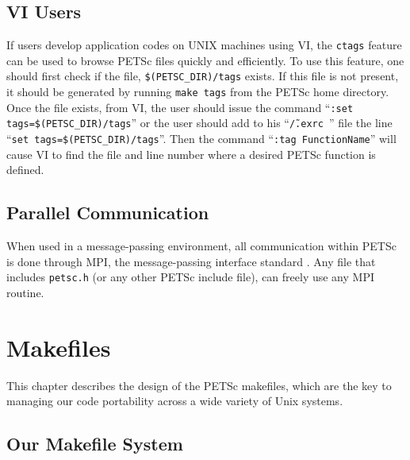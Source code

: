 \section{VI Users}  \label{sec:vi}

 
If users develop 
application codes on UNIX machines using VI, the {\tt ctags} feature 
can be used to browse PETSc files quickly and efficiently.  To use 
this feature, one should first check if the file, {\tt \$(PETSC\_DIR)/tags} 
exists.  If this file is not present, it should be generated by running 
{\tt make tags} from the PETSc home directory. Once the file exists, 
from VI, the user should issue the command ``{\tt :set tags=\$(PETSC\_DIR)/tags}'' 
or the user should add to
his ``{\tt \~/.exrc }'' file the line ``{\tt set tags=\$(PETSC\_DIR)/tags}''.
Then the command ``{\tt :tag FunctionName}'' will cause VI 
to find the file and line number where a desired PETSc function 
is defined. 

\section{Parallel Communication}

When used in a message-passing environment, all communication 
within
PETSc is done through MPI, the message-passing interface standard
\cite{MPI-final}.  Any file that includes {\tt petsc.h} (or any other 
PETSc include file), can freely use any MPI routine.

\chapter{Makefiles}
\label{ch:makefiles}

This chapter describes the design of the PETSc makefiles, which are the
key to managing our code portability across a wide variety of Unix systems.

\section{Our Makefile System}

